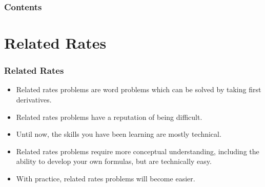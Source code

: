 \documentclass[serif,ignorenonframetext]{beamer}
\title{\commonTitleZeroTwoEight}
\subtitle{\commonSubtitleZeroTwoEight}
\author{\commonAuthor}
\institute{\commonInstitute}
\date{\commonDateZeroTwoEight}
\begin{document}

\begin{frame}
  \titlepage
\end{frame}

\begin{frame}
  \frametitle{Contents}
  \tableofcontents
\end{frame}

%  


\section{Related Rates}

\begin{frame}
  \frametitle{Related Rates}
  \begin{itemize}[<+->]
  \item Related rates problems are word problems which can
    be solved by taking first derivatives.
  \item Related rates problems have a reputation of being difficult.
  \item Until now, the skills you have been learning are mostly
    technical.
  \item Related rates problems require more conceptual understanding,
    including the ability to develop your own formulas, but are
    technically easy.
  \item With practice, related rates problems will become easier.
  \end{itemize}
\end{frame}
\end{document}
